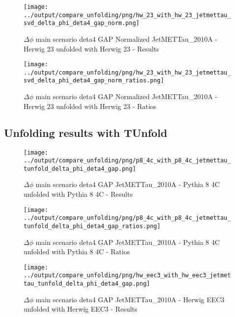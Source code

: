\documentclass[11pt]{book}
\begin{document}
\begin{figure}[ht]
\centering
\texttt{[image: ../output/compare\_unfolding/png/hw\_23\_with\_hw\_23\_jetmettau\_svd\_delta\_phi\_deta4\_gap\_norm.png]}
\caption{$\Delta\phi$ main scenario deta4 GAP Normalized JetMETTau\_2010A - Herwig 23 unfolded with Herwig 23 - Results}
\label{hw_23_hw_23_jetmettau_svd_delta_phi_deta4_gap_norm_a}
\end{figure}

\begin{figure}[ht]
\centering
\texttt{[image: ../output/compare\_unfolding/png/hw\_23\_with\_hw\_23\_jetmettau\_svd\_delta\_phi\_deta4\_gap\_norm\_ratios.png]}
\caption{$\Delta\phi$ main scenario deta4 GAP Normalized JetMETTau\_2010A - Herwig 23 unfolded with Herwig 23 - Ratios}
\label{hw_23_hw_23_jetmettau_svd_delta_phi_deta4_gap_norm_b}
\end{figure}




\clearpage
\subsection{Unfolding results with TUnfold}

\begin{figure}[ht]
\centering
\texttt{[image: ../output/compare\_unfolding/png/p8\_4c\_with\_p8\_4c\_jetmettau\_tunfold\_delta\_phi\_deta4\_gap.png]}
\caption{$\Delta\phi$ main scenario deta4 GAP JetMETTau\_2010A - Pythia 8 4C unfolded with Pythia 8 4C - Results}
\label{p8_p8_jetmettau_tunfold_delta_phi_deta4_gap_a}
\end{figure}

\begin{figure}[ht]
\centering
\texttt{[image: ../output/compare\_unfolding/png/p8\_4c\_with\_p8\_4c\_jetmettau\_tunfold\_delta\_phi\_deta4\_gap\_ratios.png]}
\caption{$\Delta\phi$ main scenario deta4 GAP JetMETTau\_2010A - Pythia 8 4C unfolded with Pythia 8 4C - Ratios}
\label{p8_p8_jetmettau_tunfold_delta_phi_deta4_gap_b}
\end{figure}

\begin{figure}[ht]
\centering
\texttt{[image: ../output/compare\_unfolding/png/hw\_eec3\_with\_hw\_eec3\_jetmettau\_tunfold\_delta\_phi\_deta4\_gap.png]}
\caption{$\Delta\phi$ main scenario deta4 GAP JetMETTau\_2010A - Herwig EEC3 unfolded with Herwig EEC3 - Results}
\label{hw_eec3_hw_eec3_jetmettau_tunfold_delta_phi_deta4_gap_a}
\end{figure}
\end{document}
